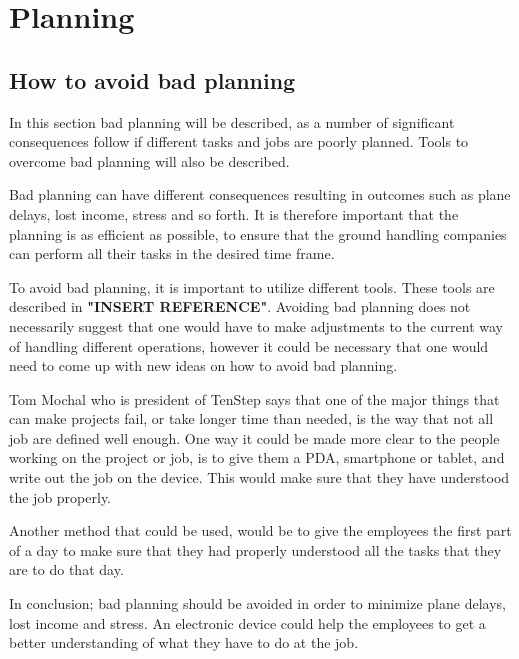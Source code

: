 \chapter{Planning}
\section{How to avoid bad planning}
In this section bad planning will be described, as a number of significant consequences follow if different tasks and jobs are poorly planned. Tools to overcome bad planning will also be described.

Bad planning can have different consequences resulting in outcomes such as plane delays, lost income, stress and so forth. It is therefore important that the planning is as efficient as possible, to ensure that the ground handling companies can perform all their tasks in the desired time frame.

To avoid bad planning, it is important to utilize different tools. These tools are described in \textbf{"INSERT REFERENCE"}. Avoiding bad planning does not necessarily suggest that one would have to make adjustments to the current way of handling different operations, however it could be necessary that one would need to come up with new ideas on how to avoid bad planning.

Tom Mochal who is president of TenStep \cite{AvoidP_TenStep} says that one of the major things that can make projects fail, or take longer time than needed, is the way that not all job are defined well enough. One way it could be made more clear to the people working on the project or job, is to give them a PDA, smartphone or tablet, and write out the job on the device. This would make sure that they have understood the job properly.


Another method that could be used, would be to give the employees the first part of a day to make sure that they had properly understood all the tasks that they are to do that day.

In conclusion; bad planning should be avoided in order to minimize plane delays, lost income and stress. An electronic device could help the employees to get a better understanding of what they have to do at the job. 
